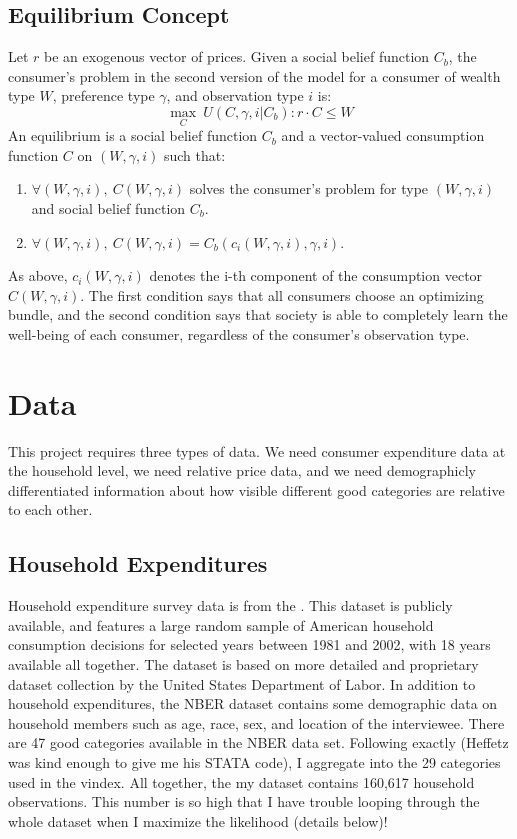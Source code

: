 \documentclass{article}
\begin{document}
\subsection{Equilibrium Concept}
Let $r$ be an exogenous vector of prices.  
Given a social belief function $C_b$, the consumer's problem in the second version of the model for a consumer of wealth type $W$, preference type $\gamma$, and observation type $i$ is:
\[ \max_C \ U(C,\gamma,i|C_b) :  r\cdot C \le W\]
An equilibrium is a social belief function $C_b$ and a vector-valued consumption function $C$ on $(W,\gamma,i)$ such that:
\begin{enumerate}
	\item $\forall (W,\gamma,i), \ C(W,\gamma,i)$ solves the consumer's problem for type $(W,\gamma,i)$ and social belief function $C_b$.
	\item $\forall (W,\gamma,i), \ C(W,\gamma,i) = C_b(c_i(W,\gamma,i),\gamma,i).$
\end{enumerate}
As above, $c_i(W,\gamma,i)$ denotes the i-th component of the consumption vector $C(W,\gamma,i)$.
The first condition says that all consumers choose an optimizing  bundle, and the second condition says that society is able to completely learn the well-being of each consumer, regardless of the consumer's observation type.
\section{Data}
This project requires three types of data.  We need consumer expenditure data at the household level, we need relative price data, and we need demographicly differentiated information about how visible different good categories are relative to each other. 
\subsection{Household Expenditures}
Household expenditure survey data is from the \citet{NBERCEX2011}.    
This dataset is publicly available, and features a large random sample of American household consumption decisions for selected years between 1981 and 2002, with 18 years available all together.  
The dataset is based on more detailed and proprietary dataset collection by the United States Department of Labor. 
In addition to household expenditures, the NBER dataset contains some demographic data on household members such as age, race, sex, and location of the interviewee.  
There are 47 good categories available in the NBER data set.
Following \citet{Heffetz2011} exactly (Heffetz was kind enough to give me his STATA code), I aggregate into the 29 categories used in the vindex.
All together, the my dataset contains 160,617 household observations.
This number is so high that I have trouble looping through the whole dataset when I maximize the likelihood (details below)!
\end{document}
